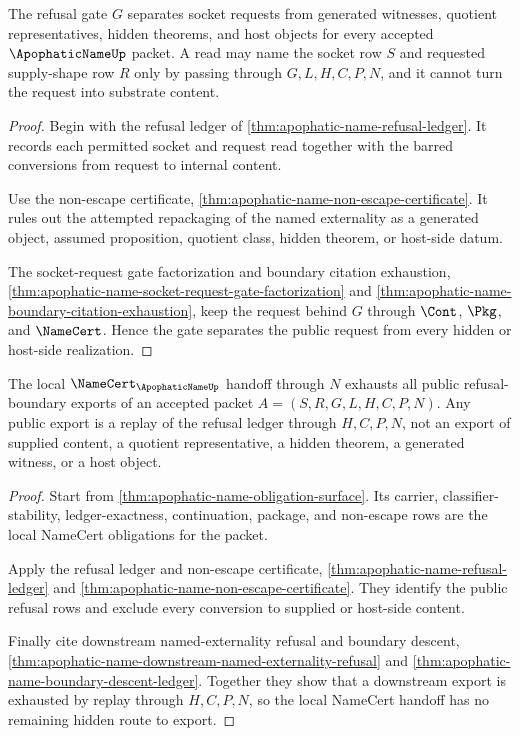 \begin{theorem}
\label{thm:apophatic-name-refusal-gate-separation}
The refusal gate $G$ separates socket requests from generated witnesses, quotient representatives, hidden theorems, and host objects for every accepted $\ApophaticNameUp$ packet. A read may name the socket row $S$ and requested supply-shape row $R$ only by passing through $G,L,H,C,P,N$, and it cannot turn the request into substrate content.
\end{theorem}
\begin{proof}
Begin with the refusal ledger of \autoref{thm:apophatic-name-refusal-ledger}. It records each permitted socket and request read together with the barred conversions from request to internal content.

Use the non-escape certificate, \autoref{thm:apophatic-name-non-escape-certificate}. It rules out the attempted repackaging of the named externality as a generated object, assumed proposition, quotient class, hidden theorem, or host-side datum.

The socket-request gate factorization and boundary citation exhaustion, \autoref{thm:apophatic-name-socket-request-gate-factorization} and \autoref{thm:apophatic-name-boundary-citation-exhaustion}, keep the request behind $G$ through $\Cont$, $\Pkg$, and $\NameCert$. Hence the gate separates the public request from every hidden or host-side realization.
\end{proof}

\begin{theorem}
\label{thm:apophatic-name-namecert-handoff-exhaustion}
The local $\NameCert_{\ApophaticNameUp}$ handoff through $N$ exhausts all public refusal-boundary exports of an accepted packet $A=(S,R,G,L,H,C,P,N)$. Any public export is a replay of the refusal ledger through $H,C,P,N$, not an export of supplied content, a quotient representative, a hidden theorem, a generated witness, or a host object.
\end{theorem}
\begin{proof}
Start from \autoref{thm:apophatic-name-obligation-surface}. Its carrier, classifier-stability, ledger-exactness, continuation, package, and non-escape rows are the local NameCert obligations for the packet.

Apply the refusal ledger and non-escape certificate, \autoref{thm:apophatic-name-refusal-ledger} and \autoref{thm:apophatic-name-non-escape-certificate}. They identify the public refusal rows and exclude every conversion to supplied or host-side content.

Finally cite downstream named-externality refusal and boundary descent, \autoref{thm:apophatic-name-downstream-named-externality-refusal} and \autoref{thm:apophatic-name-boundary-descent-ledger}. Together they show that a downstream export is exhausted by replay through $H,C,P,N$, so the local NameCert handoff has no remaining hidden route to export.
\end{proof}

